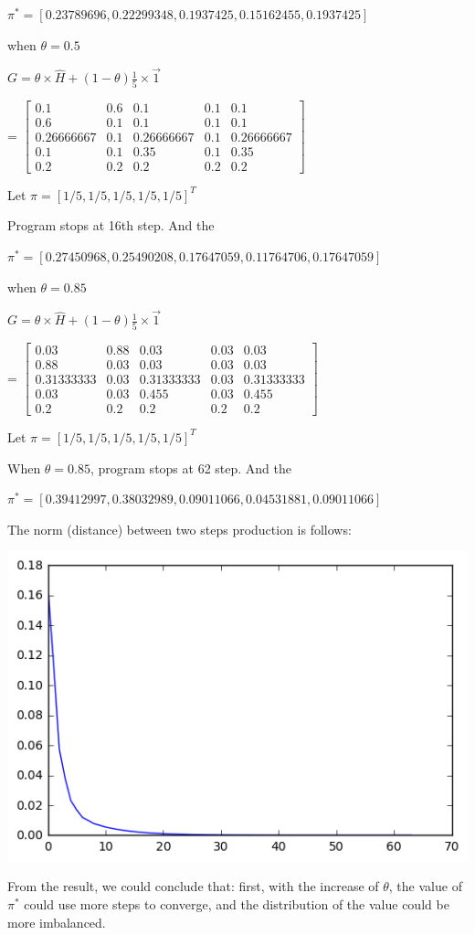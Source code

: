 \documentclass[12pt,a4paper]{article}
\begin{document}
$\pi^* =[ 0.23789696,  0.22299348,  0.1937425 ,  0.15162455,  0.1937425 ]$




when $\theta = 0.5$

$
G= \theta \times \hat{H} + (1-\theta) \frac{1}{5} \times \vec{1} 
$

=
$
\begin{bmatrix}
0.1       &  0.6       &  0.1       &  0.1       &  0.1       \\
0.6       &  0.1       &  0.1       &  0.1       &  0.1       \\
0.26666667&  0.1       &  0.26666667&  0.1       &  0.26666667\\
0.1       &  0.1       &  0.35      &  0.1       &  0.35      \\
0.2       &  0.2       &  0.2       &  0.2       &  0.2
\end{bmatrix}
$

Let $\pi = [1/5,1/5,1/5,1/5,1/5]^{T}$

Program stops at 16th step. And the 

$\pi^* =[ 0.27450968,  0.25490208,  0.17647059,  0.11764706,  0.17647059]$



when $\theta = 0.85$

$
G= \theta \times \hat{H} + (1-\theta) \frac{1}{5} \times \vec{1} 
$

=
$
\begin{bmatrix}
0.03      &  0.88      &  0.03      &  0.03      &  0.03      \\
0.88      &  0.03      &  0.03      &  0.03      &  0.03      \\
0.31333333&  0.03      &  0.31333333&  0.03      &  0.31333333\\
0.03      &  0.03      &  0.455     &  0.03      &  0.455     \\
0.2       &  0.2       &  0.2       &  0.2       &  0.2
\end{bmatrix}
$

Let $\pi = [1/5,1/5,1/5,1/5,1/5]^{T}$

When $\theta = 0.85$, program stops at 62 step. And the 

$\pi^* = [ 0.39412997,  0.38032989,  0.09011066,  0.04531881,  0.09011066]$

The norm (distance) between two steps production is follows:

\includegraphics[width=\textwidth]{PIC/b.png}

From the result, we could conclude that: first, with the increase of $\theta$, the value of $\pi^*$ could use more steps to converge, and the distribution of the value could be more imbalanced.
\end{document}
